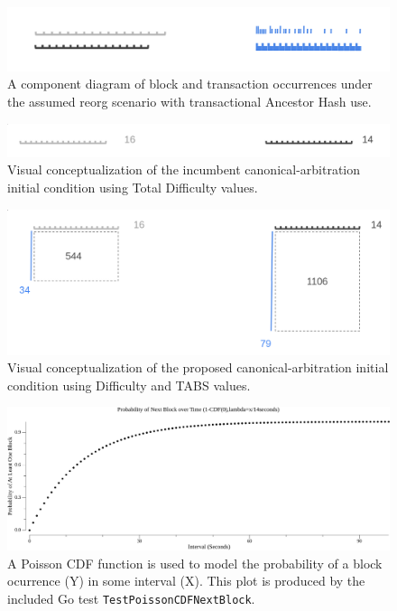 \documentclass[11pt]{article}
\theoremstyle{plain}
\begin{document}
\begin{figure}[tph]
\centering
\includegraphics[width=1.0\textwidth]{vis_blocksegment_canonpref_abstract.png}
\caption{
  A component diagram of block and transaction occurrences under the assumed
reorg scenario with transactional Ancestor Hash use.
}
\label{fig:blocksegment_forks_canonpref_incumbent_ex}
\end{figure}

\begin{figure}[tph]
\centering
\includegraphics[width=1.0\textwidth]{vis_blocksegment_canonpref_incumbent_ex.png}
\caption{Visual conceptualization of the incumbent canonical-arbitration
initial condition using Total Difficulty values.
}
\label{fig:blocksegment_forks_canonpref_incumbent_ex}
\end{figure}


\begin{figure}[tph]
\centering
\includegraphics[width=1.0\textwidth]{vis_blocksegment_canonpref_proposed_ex.png}
\caption{Visual conceptualization of the proposed canonical-arbitration initial
condition using Difficulty and TABS values.
}
\label{fig:blocksegment_forks_canonpref_proposed_ex}
\end{figure}

\begin{figure}[tph]
    \label{go-block-step-cdf-interval}
    \centering
    \includegraphics[width=1.0\textwidth]{go-block-step/out/vis_poisson_cdf_next_in_interval.png}
    \caption{
      A Poisson CDF function is used to model the probability of a block
ocurrence (Y) in some interval (X).
      This plot is produced by the included Go test
\texttt{TestPoissonCDFNextBlock}.
    }
\end{figure}
\end{document}
